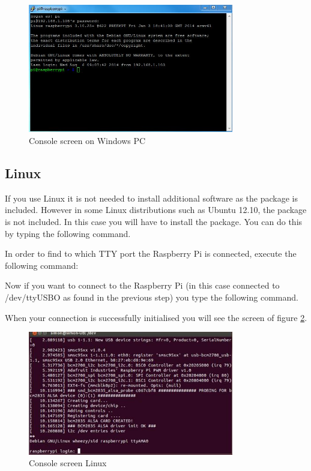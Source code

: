 \begin{figure}[!htbp]
	\centering
		\includegraphics[width=0.80\textwidth]{images/console-windows.jpg}
	\caption{Console screen on Windows PC}
	\label{fig:console-windows}
\end{figure}

\subsection*{Linux}
If you use Linux it is not needed to install additional software as the  package is included. However in some Linux distributions such as Ubuntu 12.10, the  package is not included. In this case you will have to install the package. You can do this by typing the following command.

\begin{flushleft}
\end{flushleft}

In order to find to which TTY port the Raspberry Pi is connected, execute the following command:

\begin{flushleft}
\end{flushleft}

Now if you want to connect to the Raspberry Pi (in this case connected to /dev/ttyUSBO as found in the previous step) you type the following command.

\begin{flushleft}
\end{flushleft}

When your connection is successfully initialised you will see the screen of figure \ref{fig:console-linux}.

\begin{figure}[!htbp]
	\centering
		\includegraphics[width=0.80\textwidth]{images/console-linux.jpg}
	\caption{Console screen Linux}
	\label{fig:console-linux}
\end{figure}
